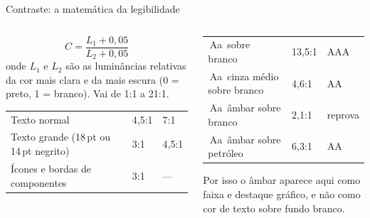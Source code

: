 \documentclass[aspectratio=169,10pt]{beamer}
\begin{document}
\begin{frame}{Contraste: a matemática da legibilidade}
  \begin{columns}[T]
    \begin{column}{0.5\textwidth}
      \begin{definicao}
        \[ C = \frac{L_1 + 0{,}05}{L_2 + 0{,}05} \]
        onde $L_1$ e $L_2$ são as luminâncias relativas da cor mais clara e da mais escura (0 = preto, 1 = branco). Vai de 1:1 a 21:1.
      \end{definicao}
      \scriptsize
      \begin{tabularx}{\linewidth}{@{}L l l@{}}
        \toprule
         &  &  \\
        \midrule
        Texto normal & 4,5:1 & 7:1 \\
        Texto grande (18\,pt ou 14\,pt negrito) & 3:1 & 4,5:1 \\
        Ícones e bordas de componentes & 3:1 & --- \\
        \bottomrule
      \end{tabularx}
    \end{column}
    \begin{column}{0.48\textwidth}
      \begin{exemplo}
        \scriptsize
        \begin{tabular}{@{}l l l@{}}
          \colorbox{azulpetroleo}{\color{white}\,Aa\,} sobre branco & 13,5:1 & \textcolor{verdeok}{AAA} \\[2pt]
          \colorbox{white}{\color{cinzamedio}\,Aa\,} cinza médio sobre branco & 4,6:1 & \textcolor{verdeok}{AA} \\[2pt]
          \colorbox{ambarclaro!40}{\color{ambar}\,Aa\,} âmbar sobre branco & 2,1:1 & \textcolor{vermelhoerro}{reprova} \\[2pt]
          \colorbox{azulpetroleo}{\color{ambar}\,Aa\,} âmbar sobre petróleo & 6,3:1 & \textcolor{verdeok}{AA} \\
        \end{tabular}
      \end{exemplo}
      \begin{dica}
        Por isso o âmbar aparece aqui como faixa e destaque gráfico, e não como cor de texto sobre fundo branco.
      \end{dica}
    \end{column}
  \end{columns}
\end{frame}
\end{document}
